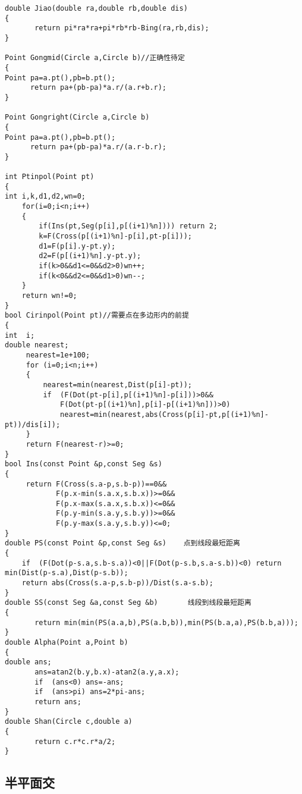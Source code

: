 \documentclass{article}
\begin{document}
\begin{CJK*}{UTF8}{song}
\begin{lstlisting}
double Jiao(double ra,double rb,double dis)
{
       return pi*ra*ra+pi*rb*rb-Bing(ra,rb,dis);
}

Point Gongmid(Circle a,Circle b)//正确性待定
{
Point pa=a.pt(),pb=b.pt();
      return pa+(pb-pa)*a.r/(a.r+b.r);
}

Point Gongright(Circle a,Circle b)
{
Point pa=a.pt(),pb=b.pt();
      return pa+(pb-pa)*a.r/(a.r-b.r);
}

int Ptinpol(Point pt)
{
int i,k,d1,d2,wn=0;
    for(i=0;i<n;i++)
    {
        if(Ins(pt,Seg(p[i],p[(i+1)%n]))) return 2;
        k=F(Cross(p[(i+1)%n]-p[i],pt-p[i]));
        d1=F(p[i].y-pt.y);
        d2=F(p[(i+1)%n].y-pt.y);
        if(k>0&&d1<=0&&d2>0)wn++;
        if(k<0&&d2<=0&&d1>0)wn--;
    }
    return wn!=0;
}
bool Cirinpol(Point pt)//需要点在多边形内的前提
{
int  i;
double nearest;
     nearest=1e+100;
     for (i=0;i<n;i++)
     {
         nearest=min(nearest,Dist(p[i]-pt));
         if  (F(Dot(pt-p[i],p[(i+1)%n]-p[i]))>0&&
             F(Dot(pt-p[(i+1)%n],p[i]-p[(i+1)%n]))>0)
             nearest=min(nearest,abs(Cross(p[i]-pt,p[(i+1)%n]-pt))/dis[i]);
     }
     return F(nearest-r)>=0;
}
bool Ins(const Point &p,const Seg &s)
{
     return F(Cross(s.a-p,s.b-p))==0&&
            F(p.x-min(s.a.x,s.b.x))>=0&&
            F(p.x-max(s.a.x,s.b.x))<=0&&
            F(p.y-min(s.a.y,s.b.y))>=0&&
            F(p.y-max(s.a.y,s.b.y))<=0;
}
double PS(const Point &p,const Seg &s)    点到线段最短距离
{
	if  (F(Dot(p-s.a,s.b-s.a))<0||F(Dot(p-s.b,s.a-s.b))<0) return min(Dist(p-s.a),Dist(p-s.b));
	return abs(Cross(s.a-p,s.b-p))/Dist(s.a-s.b);
}
double SS(const Seg &a,const Seg &b)       线段到线段最短距离
{
       return min(min(PS(a.a,b),PS(a.b,b)),min(PS(b.a,a),PS(b.b,a)));
}
double Alpha(Point a,Point b)
{
double ans;
       ans=atan2(b.y,b.x)-atan2(a.y,a.x);
       if  (ans<0) ans=-ans;
       if  (ans>pi) ans=2*pi-ans;
       return ans;
}
double Shan(Circle c,double a)
{
       return c.r*c.r*a/2;
}
\end{lstlisting}
\subsection{半平面交}
\begin{lstlisting}


\end{lstlisting}
\end{CJK*}
\end{document}
